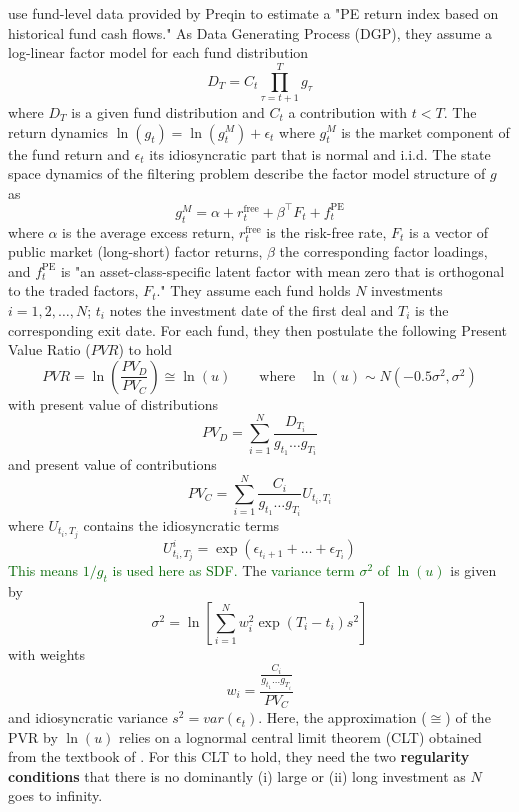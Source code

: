 \cite{ACGP18} use fund-level data provided by Preqin to estimate a "PE return index based on historical fund cash flows."
As Data Generating Process (DGP), they assume a log-linear factor model for each fund distribution
\begin{equation}
	\label{eq:data_generating_process}
	D_T = C_t \prod_{\tau=t+1}^{T} g_{\tau}
\end{equation}
where $D_T$ is a given fund distribution and $C_t$ a contribution with $t<T$.
The return dynamics $\ln (g_t) = \ln (g_t^M) + \epsilon_t$ where $g_t^M$ is the market component of the fund return and $\epsilon_t$ its idiosyncratic part that is normal and i.i.d.
The state space dynamics of the filtering problem describe the factor model structure of $g$ as
\[
g_t^M = \alpha + r_t^{\mathrm{free}} + \beta^{\top} F_t + f_t^{\mathrm{PE}}
\]
where $\alpha$ is the average excess return, $r_t^{\mathrm{free}}$ is the risk-free rate, $F_t$ is a vector of public market (long-short) factor returns, $\beta$ the corresponding factor loadings, and $f_t^{\mathrm{PE}}$ is "an asset-class-specific latent factor with mean zero that is orthogonal to the traded factors, $F_t$."
They assume each fund holds $N$ investments $i=1,2,\dots,N$; $t_i$ notes the investment date of the first deal and $T_i$ is the corresponding exit date.
For each fund, they then postulate the following Present Value Ratio ($PVR$) to hold
\begin{equation}
	\label{eq:pvr_ang_2018}
	PVR = \ln \left(\frac{PV_D}{PV_C}\right) \cong \ln (u) \qquad \mathrm{where} \quad \ln (u) \sim N \left( - 0.5 \sigma^2, \sigma^2 \right)
\end{equation}
with present value of distributions
\[
PV_D = \sum_{i=1}^N \frac{D_{T_i}}{g_{t_1} \dots g_{T_i}}
\]
and present value of contributions
\[
PV_C = \sum_{i=1}^N \frac{C_{i}}{g_{t_1} \dots g_{T_i}} U_{t_i, T_i}
\]
where $U_{t_i, T_j}$ contains the idiosyncratic terms
\[
U_{t_i, T_j}^i = \exp \left( \epsilon_{t_i + 1} + \dots + \epsilon_{T_i} \right)
\]
\textcolor{darkgreen}{
	This means $1/g_t$ is used here as SDF.
}
The \textcolor{darkgreen}{variance term $\sigma^2$ of $\ln (u)$} is given by
\[
\sigma^2 = \ln \left[ \sum_{i=1}^N w_i^2 \exp \left( T_i - t_i \right) s^2 \right]
\]
with weights 
\[
w_i = \frac{\frac{C_{i}}{g_{t_1} \dots g_{T_i}}}{PV_C}
\]
and idiosyncratic variance $s^2 = var( \epsilon_t )$.
Here, the approximation ($\cong$) of the PVR by $\ln (u)$ relies on a lognormal central limit theorem (CLT) obtained from the textbook of \cite{BT13}.
For this CLT to hold, they need the two \textbf{regularity conditions} that there is no dominantly (i) large or (ii) long investment as $N$ goes to infinity.
